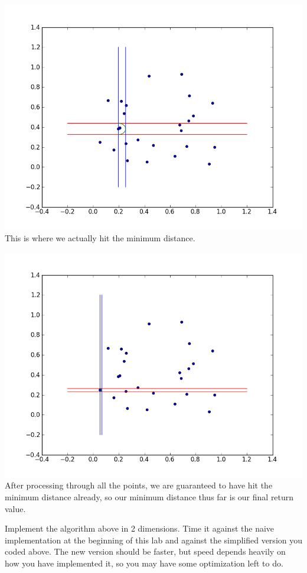 \includegraphics[width = \textwidth]{ptsweep20.png}
This is where we actually hit the minimum distance.

\includegraphics[width = \textwidth]{ptsweep23.png}
After processing through all the points, we are guaranteed to have hit the minimum distance already, so our minimum distance thus far is our final return value.

\begin{problem}
Implement the algorithm above in 2 dimensions. 
Time it against the naive implementation at the beginning of this lab and against the simplified version you coded above.
The new version should be faster, but speed depends heavily on how you have implemented it, so you may have some optimization left to do.
\end{problem}


